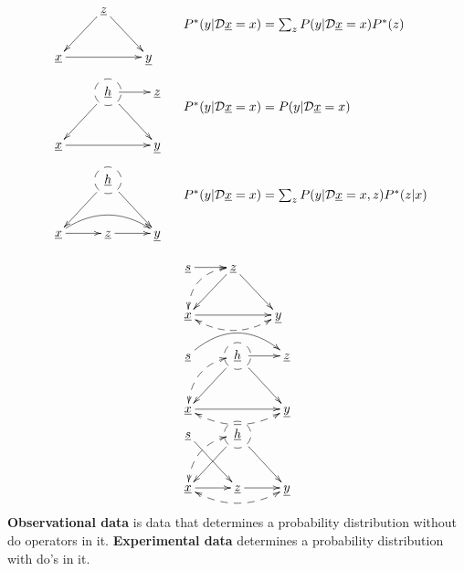 \begin{figure}[h!]
$$
\begin{array}{ll}
\xymatrix{
&\rvz\ar[dl]\ar[dr]
\\
\rvx\ar[rr]&&\rvy
}
&
\begin{array}{l}
\\
\\
P^*(y|\cald \rvx=x)=
\sum_z
P(y|\cald \rvx=x)P^*(z)
\end{array}
\\
\xymatrix{
&*++[F-o]{\rvh}\ar[dl]\ar[dr]\ar[r]
&\rvz
\\
\rvx\ar[rr]&&\rvy
}
&
\begin{array}{l}
\\
\\
P^*(y|\cald \rvx=x)=
P(y|\cald \rvx=x)
\end{array}
\\
\xymatrix{
&*++[F-o]{\rvh}\ar[dl]\ar[dr]
\\
\rvx\ar[r]\ar@/^1.2pc/[rr]
&\rvz\ar[r]&\rvy
}
&
\begin{array}{l}
\\
\\
P^*(y|\cald \rvx=x)=
\sum_z
P(y|\cald \rvx=x, z)P^*(z|x)
\end{array}
\end{array}
$$
\end{figure}

\newpage


\begin{figure}[h!]
$$
\begin{array}{l}
\xymatrix{
\rvs\ar[r]
&\rvz\ar[dl]\ar[dr]\ar@{<-->}@/_1pc/[dl]
\\
\rvx\ar[rr]\ar@{<-->}@/_1pc/[rr]
&&\rvy
}
\\
\\
\xymatrix{
\rvs\ar@/^1.5pc/[rr]
&*++[F-o]{\rvh}\ar[dl]\ar[dr]\ar[r]
\ar@{<-->}@/_1pc/[dl]
&\rvz
\\
\rvx\ar[rr]\ar@{<-->}@/_1pc/[rr]
&&\rvy
}
\\
\xymatrix{
\rvs\ar[rd]
&*++[F-o]{\rvh}\ar[dl]\ar[dr]
\ar@{<-->}@/_1pc/[dl]
\\
\rvx\ar[r]\ar@{<-->}@/_1pc/[rr]
&\rvz\ar[r]
&\rvy
}
\end{array}
$$
\end{figure}
\newpage

{\bf Observational data} is data that
determines a probability distribution
without do operators in it.
 {\bf Experimental data} 
determines a probability distribution
 with do's in it.


